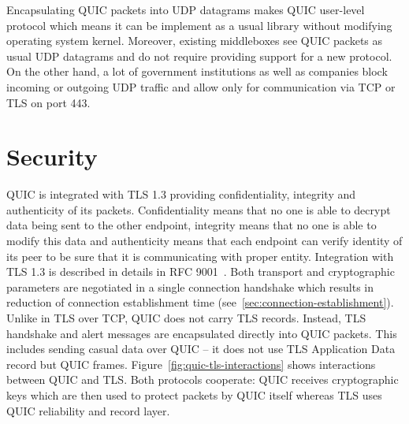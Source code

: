 Encapsulating QUIC packets into UDP datagrams makes QUIC user-level protocol which means it can be implement as a usual
library without modifying operating system kernel.
Moreover, existing middleboxes see QUIC packets as usual UDP datagrams and do not require providing support for a new protocol.
On the other hand, a lot of government institutions as well as companies block incoming or outgoing UDP traffic and allow
only for communication via TCP or TLS on port 443.


\section{Security}
\label{sec:security}
QUIC is integrated with TLS 1.3 providing confidentiality, integrity and authenticity of its packets.
Confidentiality means that no one is able to decrypt data being sent to the other endpoint, integrity means that no one
is able to modify this data and authenticity means that each endpoint can verify identity of
its peer to be sure that it is communicating with proper entity.
Integration with TLS 1.3 is described in details in RFC 9001~\cite{rfc9001}.
Both transport and cryptographic parameters are negotiated in a single connection handshake which results in
reduction of connection establishment time (see~\ref{sec:connection-establishment}).
Unlike in TLS over TCP, QUIC does not carry TLS records.
Instead, TLS handshake and alert messages are encapsulated directly into QUIC packets.
This includes sending casual data over QUIC -- it does not use TLS Application Data record but QUIC frames.
Figure~\ref{fig:quic-tls-interactions} shows interactions between QUIC and TLS\@.
Both protocols cooperate: QUIC receives cryptographic keys which are then used to protect packets by QUIC itself whereas
TLS uses QUIC reliability and record layer.


